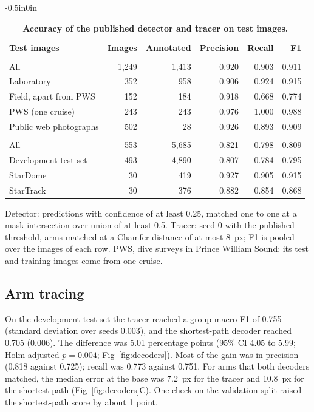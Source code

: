 \begin{table}[!ht]
\begin{adjustwidth}{-0.5in}{0in}
\centering
\caption{{\bf Accuracy of the published detector and tracer on test images.}}
\begin{tabular}{|l|r|r|r|r|r|}
\hline
{\bf Test images} & {\bf Images} & {\bf Annotated} & {\bf Precision} & {\bf Recall} & {\bf F1}\\ \thickhline
\multicolumn{6}{|l|}{{\bf Detector}: sunflower sea stars}\\ \hline
All & 1,249 & 1,413 & 0.920 & 0.903 & 0.911\\ \hline
Laboratory & 352 & 958 & 0.906 & 0.924 & 0.915\\ \hline
Field, apart from PWS & 152 & 184 & 0.918 & 0.668 & 0.774\\ \hline
PWS (one cruise) & 243 & 243 & 0.976 & 1.000 & 0.988\\ \hline
Public web photographs & 502 & 28 & 0.926 & 0.893 & 0.909\\ \thickhline
\multicolumn{6}{|l|}{{\bf Tracer}: arms}\\ \hline
All & 553 & 5,685 & 0.821 & 0.798 & 0.809\\ \hline
Development test set & 493 & 4,890 & 0.807 & 0.784 & 0.795\\ \hline
StarDome & 30 & 419 & 0.927 & 0.905 & 0.915\\ \hline
StarTrack & 30 & 376 & 0.882 & 0.854 & 0.868\\ \hline
\end{tabular}
\begin{flushleft} Detector: predictions with confidence of at least 0.25, matched one to one at a mask intersection over union of at least 0.5. Tracer: seed 0 with the published threshold, arms matched at a Chamfer distance of at most 8~px; F1 is pooled over the images of each row. PWS, dive surveys in Prince William Sound: its test and training images come from one cruise.
\end{flushleft}
\label{tab:accuracy}
\end{adjustwidth}
\end{table}

\subsection*{Arm tracing}

On the development test set the tracer reached a group-macro F1 of 0.755 (standard deviation over seeds 0.003), and the shortest-path decoder reached 0.705 (0.006).
The difference was 5.01 percentage points (95\% CI 4.05 to 5.99; Holm-adjusted $p = 0.004$; Fig~\ref{fig:decoders}).
Most of the gain was in precision (0.818 against 0.725); recall was 0.773 against 0.751.
For arms that both decoders matched, the median error at the base was 7.2~px for the tracer and 10.8~px for the shortest path (Fig~\ref{fig:decoders}C).
One check on the validation split raised the shortest-path score by about 1 point.


